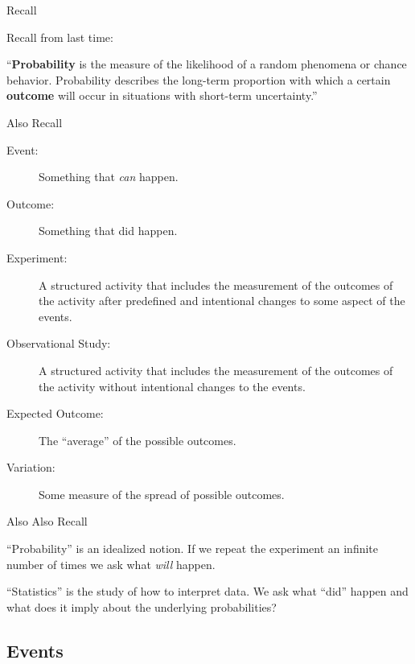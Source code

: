 \begin{frame}{Recall}

  Recall from last time:

  \begin{definition}[Probability]
    ``\textbf{Probability} is the measure of the likelihood of a random
    phenomena or chance behavior. Probability describes the long-term
    proportion with which a certain \textbf{outcome} will occur in
    situations with short-term uncertainty.'' %
  \end{definition}

  
\end{frame}


\begin{frame}{Also Recall}

  \begin{description}
  \item[Event:] Something that \textit{can} happen.
  \item[Outcome:] Something that did happen.
  \item[Experiment:] A structured activity that includes the
    measurement of the outcomes of the activity after predefined and
    intentional changes to some aspect of the events.
  \item[Observational Study:] A structured activity that includes the
    measurement of the outcomes of the activity without intentional
    changes to the events.
  \item[Expected Outcome:] The ``average'' of the possible outcomes.
  \item[Variation:] Some measure of the spread of possible outcomes.
  \end{description}
  
\end{frame}

\begin{frame}{Also Also Recall}

  ``Probability'' is an idealized notion. If we repeat the experiment
  an infinite number of times we ask what \textit{will} happen.

  \vfill

  ``Statistics'' is the study of how to interpret data. We ask what
  ``did'' happen and what does it imply about the underlying
  probabilities?

  \vfill

\end{frame}


\subsection{Events}

